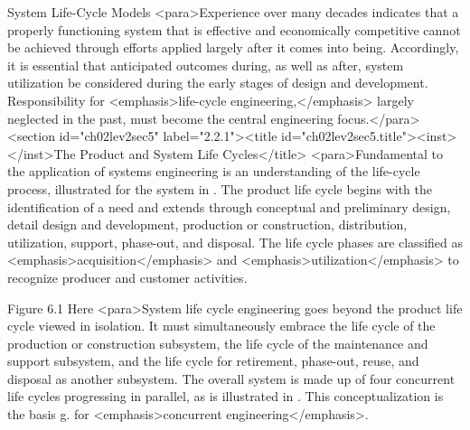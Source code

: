 System Life-Cycle Models
<para>Experience over many decades indicates that a properly functioning system that is effective and economically competitive cannot be achieved through efforts applied largely after it comes into being. Accordingly, it is essential that anticipated outcomes during, as well as after, system utilization be considered during the early stages of design and development. Responsibility for <emphasis>life-cycle engineering,</emphasis> largely neglected in the past, must become the central engineering focus.</para>
<section id="ch02lev2sec5" label="2.2.1"><title id="ch02lev2sec5.title"><inst></inst>The Product and System Life Cycles</title>
<para>Fundamental to the application of systems engineering is an understanding of the life-cycle process, illustrated for the system in . The product life cycle begins with the identification of a need and extends through conceptual and preliminary design, detail design and development, production or construction, distribution, utilization, support, phase-out, and disposal. The life cycle phases are classified as <emphasis>acquisition</emphasis> and <emphasis>utilization</emphasis> to recognize producer and customer activities.

Figure 6.1 Here
<para>System life cycle engineering goes beyond the product life cycle viewed in isolation. It must simultaneously embrace the life cycle of the production or construction subsystem, the life cycle of the maintenance and support subsystem, and the life cycle for retirement, phase-out, reuse, and disposal as another subsystem. The overall system is made up of four concurrent life cycles progressing in parallel, as is illustrated in . This conceptualization is the basis g. for <emphasis>concurrent engineering</emphasis>.

